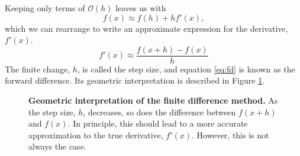 Keeping only terms of $\mathcal{O}(h)$ leaves us with
\begin{equation}
    f(x) \approx f(h) + hf'(x),
\end{equation}
which we can rearrange to write an approximate expression for the derivative,
$f'(x)$.
\begin{equation}
    f'(x) \approx \frac{f(x+h)-f(x)}{h}
    \label{eq:fd}
\end{equation}
The finite change, $h$, is called the step size, and equation \eqref{eq:fd} 
is known as the forward difference. Its geometric interpretation is 
described in Figure \ref{fig:fd-schematic}.
\begin{figure}[H]
    \centering
    \caption{\textbf{Geometric interpretation of the finite difference 
    method.} As the step size, $h$, decreases, so does the difference 
    between $f(x+h)$ and $f(x)$. In principle, this should lead to a more 
    accurate approximation to the true derivative, $f'(x)$. However, this is
    not always the case.}
    \label{fig:fd-schematic}
\end{figure}

